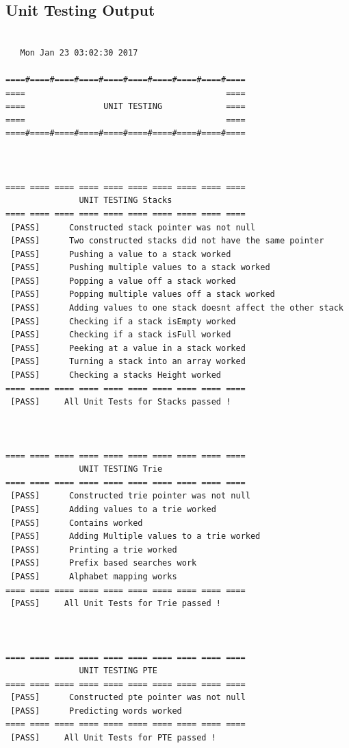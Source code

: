 \documentclass[10pt]{article} %
\begin{document}
	\subsection{Unit Testing Output} \label{appendix:UnitTestOutput}
	    \begin{lstlisting}

   Mon Jan 23 03:02:30 2017
 
====#====#====#====#====#====#====#====#====#==== 
====                                         ==== 
====                UNIT TESTING             ==== 
====                                         ==== 
====#====#====#====#====#====#====#====#====#==== 



==== ==== ==== ==== ==== ==== ==== ==== ==== ==== 
               UNIT TESTING Stacks 
==== ==== ==== ==== ==== ==== ==== ==== ==== ==== 
 [PASS] 	 Constructed stack pointer was not null
 [PASS] 	 Two constructed stacks did not have the same pointer
 [PASS] 	 Pushing a value to a stack worked
 [PASS] 	 Pushing multiple values to a stack worked
 [PASS] 	 Popping a value off a stack worked
 [PASS] 	 Popping multiple values off a stack worked
 [PASS] 	 Adding values to one stack doesnt affect the other stack
 [PASS] 	 Checking if a stack isEmpty worked
 [PASS] 	 Checking if a stack isFull worked
 [PASS] 	 Peeking at a value in a stack worked
 [PASS] 	 Turning a stack into an array worked
 [PASS] 	 Checking a stacks Height worked
==== ==== ==== ==== ==== ==== ==== ==== ==== ==== 
 [PASS] 	All Unit Tests for Stacks passed ! 



==== ==== ==== ==== ==== ==== ==== ==== ==== ==== 
               UNIT TESTING Trie 
==== ==== ==== ==== ==== ==== ==== ==== ==== ==== 
 [PASS] 	 Constructed trie pointer was not null
 [PASS] 	 Adding values to a trie worked
 [PASS] 	 Contains worked
 [PASS] 	 Adding Multiple values to a trie worked
 [PASS] 	 Printing a trie worked
 [PASS] 	 Prefix based searches work
 [PASS] 	 Alphabet mapping works
==== ==== ==== ==== ==== ==== ==== ==== ==== ==== 
 [PASS] 	All Unit Tests for Trie passed ! 



==== ==== ==== ==== ==== ==== ==== ==== ==== ==== 
               UNIT TESTING PTE 
==== ==== ==== ==== ==== ==== ==== ==== ==== ==== 
 [PASS] 	 Constructed pte pointer was not null
 [PASS] 	 Predicting words worked
==== ==== ==== ==== ==== ==== ==== ==== ==== ==== 
 [PASS] 	All Unit Tests for PTE passed ! 




\end{lstlisting}
\end{document}
